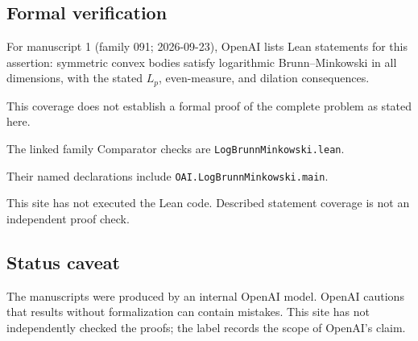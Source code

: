 \documentclass[11pt]{article}
\begin{document}
\subsection{Formal verification}
For manuscript 1 (family 091; 2026-09-23), OpenAI lists Lean statements for this assertion: symmetric convex bodies satisfy logarithmic Brunn--Minkowski in all dimensions, with the stated $L_p$, even-measure, and dilation consequences.

This coverage does not establish a formal proof of the complete problem as stated here.

The linked family Comparator checks are \texttt{LogBrunnMinkowski.lean}.

Their named declarations include \texttt{OAI.LogBrunnMinkowski.main}.

This site has not executed the Lean code. Described statement coverage is not an independent proof check.

\subsection{Status caveat}
The manuscripts were produced by an internal OpenAI model. OpenAI cautions that results without formalization can contain mistakes. This site has not independently checked the proofs; the label records the scope of OpenAI's claim.
\end{document}
